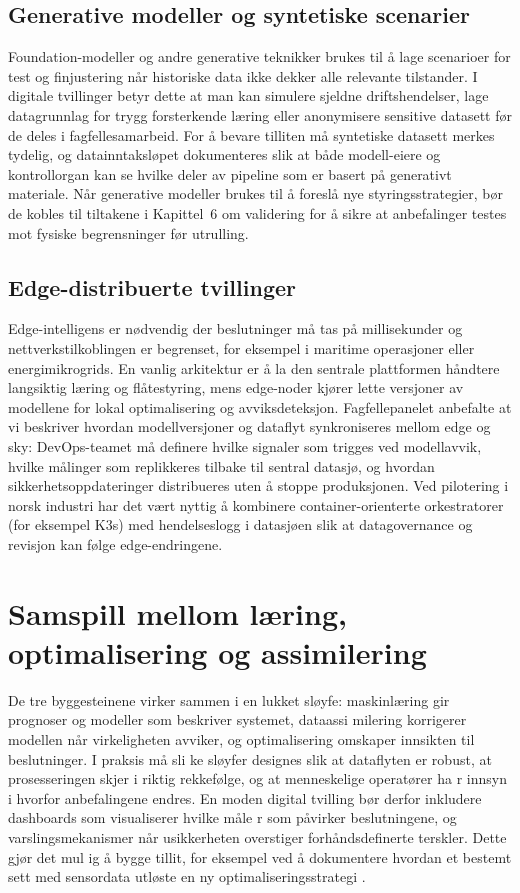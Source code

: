 \subsection{Generative modeller og syntetiske scenarier}
Foundation-modeller og andre generative teknikker brukes til å lage scenarioer for test og finjustering når historiske data ikke dekker alle relevante tilstander.\citep{bommasani2021opportunities} I digitale tvillinger betyr dette at man kan simulere sjeldne driftshendelser, lage datagrunnlag for trygg forsterkende læring eller anonymisere sensitive datasett før de deles i fagfellesamarbeid. For å bevare tilliten må syntetiske datasett merkes tydelig, og datainntaksløpet dokumenteres slik at både modell-eiere og kontrollorgan kan se hvilke deler av pipeline som er basert på generativt materiale. Når generative modeller brukes til å foreslå nye styringsstrategier, bør de kobles til tiltakene i Kapittel~6 om validering for å sikre at anbefalinger testes mot fysiske begrensninger før utrulling.

\subsection{Edge-distribuerte tvillinger}
Edge-intelligens er nødvendig der beslutninger må tas på millisekunder og nettverkstilkoblingen er begrenset, for eksempel i maritime operasjoner eller energimikrogrids.\citep{shi2016edge} En vanlig arkitektur er å la den sentrale plattformen håndtere langsiktig læring og flåtestyring, mens edge-noder kjører lette versjoner av modellene for lokal optimalisering og avviksdeteksjon. Fagfellepanelet anbefalte at vi beskriver hvordan modellversjoner og dataflyt synkroniseres mellom edge og sky: DevOps-teamet må definere hvilke signaler som trigges ved modellavvik, hvilke målinger som replikkeres tilbake til sentral datasjø, og hvordan sikkerhetsoppdateringer distribueres uten å stoppe produksjonen. Ved pilotering i norsk industri har det vært nyttig å kombinere container-orienterte orkestratorer (for eksempel K3s) med hendelseslogg i datasjøen slik at datagovernance og revisjon kan følge edge-endringene.

\section{Samspill mellom læring, optimalisering og assimilering}
De tre byggesteinene virker sammen i en lukket sløyfe: maskinlæring gir prognoser og modeller som beskriver systemet, dataassi
milering korrigerer modellen når virkeligheten avviker, og optimalisering omskaper innsikten til beslutninger. I praksis må sli
ke sløyfer designes slik at dataflyten er robust, at prosesseringen skjer i riktig rekkefølge, og at menneskelige operatører ha
r innsyn i hvorfor anbefalingene endres. En moden digital tvilling bør derfor inkludere dashboards som visualiserer hvilke måle
r som påvirker beslutningene, og varslingsmekanismer når usikkerheten overstiger forhåndsdefinerte terskler. Dette gjør det mul
ig å bygge tillit, for eksempel ved å dokumentere hvordan et bestemt sett med sensordata utløste en ny optimaliseringsstrategi
.


